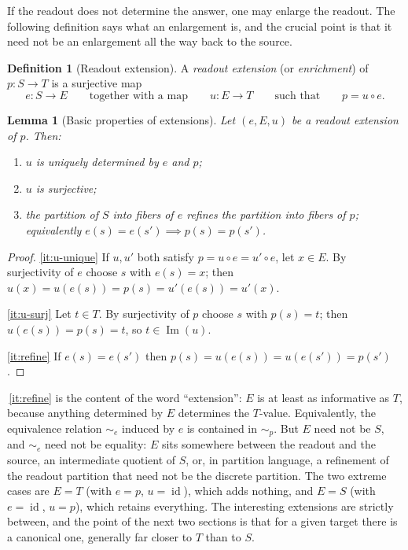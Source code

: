 \documentclass[11pt,reqno]{amsart}
\theoremstyle{plain}
\newtheorem{lemma}[theorem]{Lemma}
\theoremstyle{definition}
\newtheorem{definition}[theorem]{Definition}
\newcommand{\Src}{S}
\newcommand{\Rdt}{T}
\newcommand{\Img}{\operatorname{Im}}
\newcommand{\id}{\operatorname{id}}
\begin{document}
If the readout does not determine the answer, one may enlarge the readout. The following
definition says what an enlargement is, and the crucial point is that it need not be an
enlargement all the way back to the source.

\begin{definition}[Readout extension]\label{def:extension}
A \emph{readout extension} (or \emph{enrichment}) of $p\colon\Src\to\Rdt$ is a surjective map
\begin{equation}\label{eq:extension}
e\colon\Src\longrightarrow E
\qquad\text{together with a map}\qquad
u\colon E\longrightarrow\Rdt
\qquad\text{such that}\qquad
p=u\circ e .
\end{equation}
\end{definition}

\begin{lemma}[Basic properties of extensions]\label{lem:extension-basic}
Let $(e,E,u)$ be a readout extension of $p$. Then:
\begin{enumerate}
\item\label{it:u-unique} $u$ is uniquely determined by $e$ and $p$;
\item\label{it:u-surj} $u$ is surjective;
\item\label{it:refine} the partition of $\Src$ into fibers of $e$ refines the partition into
fibers of $p$; equivalently $e(s)=e(s')\implies p(s)=p(s')$.
\end{enumerate}
\end{lemma}

\begin{proof}
\eqref{it:u-unique} If $u,u'$ both satisfy $p=u\circ e=u'\circ e$, let $x\in E$. By surjectivity
of $e$ choose $s$ with $e(s)=x$; then $u(x)=u(e(s))=p(s)=u'(e(s))=u'(x)$.

\eqref{it:u-surj} Let $t\in\Rdt$. By surjectivity of $p$ choose $s$ with $p(s)=t$; then
$u(e(s))=p(s)=t$, so $t\in\Img(u)$.

\eqref{it:refine} If $e(s)=e(s')$ then $p(s)=u(e(s))=u(e(s'))=p(s')$.
\end{proof}

\,\eqref{it:refine} is the content of the word ``extension'': $E$ is at
least as informative as $\Rdt$, because anything determined by $E$ determines the $\Rdt$-value.
Equivalently, the equivalence relation $\sim_e$ induced by $e$ is contained in $\sim_p$. But $E$
need not be $\Src$, and $\sim_e$ need not be equality: $E$ sits somewhere between the readout and
the source, an intermediate quotient of $\Src$, or, in partition language, a refinement of the
readout partition that need not be the discrete partition. The two extreme cases are $E=\Rdt$
(with $e=p$, $u=\id$), which adds nothing, and $E=\Src$ (with $e=\id$, $u=p$), which retains
everything. The interesting extensions are strictly between, and the point of the next two
sections is that for a given target there is a canonical one, generally far closer to $\Rdt$ than
to $\Src$.
\end{document}
